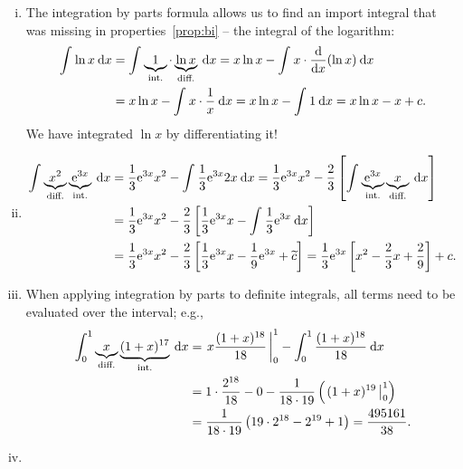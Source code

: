 \begin{example}
\begin{enumerate}[(i)]
	\item 
	The integration by parts formula allows us to find an import integral that was missing in properties~\ref{prop:bi} -- the integral of the logarithm:
	\begin{equation*}
	\begin{split}
	\int_{}^{} \ln x \: \mathrm{d} x 
	& =	\int_{}^{} \underbrace{1}_{\text{int.}} \cdot \underbrace{\ln x}_{\text{diff.}} \: \mathrm{d} x
	= x\ln x - \int_{}^{} x \cdot \displaystyle{\frac{\mathrm{d}}{\mathrm{d}x}}(\ln x) \: \mathrm{d} x \\
	& = x\ln x - \int_{}^{} x\cdot\frac{1}{x} \: \mathrm{d} x
	= x\ln x - \int_{}^{} 1 \: \mathrm{d} x = x\ln x - x + c.
	\end{split}
	\end{equation*}
	We have integrated $\ln x$ by differentiating it!
	\item \begin{equation*}
	\begin{split}
	\int_{}^{} \underbrace{x^2}_{\text{diff.}} \underbrace{\mathrm{e}^{3x}}_{\text{int.}} \: \mathrm{d} x 
	& = \frac13\mathrm{e}^{3x}x^2 - \int_{}^{} \frac13\mathrm{e}^{3x}2x  \: \mathrm{d} x
	= \frac13\mathrm{e}^{3x}x^2 - \frac23 \left[ 
	\int_{}^{} \underbrace{\mathrm{e}^{3x}}_{\text{int.}}\underbrace{x}_{\text{diff.}}  \: \mathrm{d} x \right] \\
	& = \frac13\mathrm{e}^{3x}x^2 - \frac23 
	\left[ \frac13 \mathrm{e}^{3x}x - \int_{}^{} \frac13\mathrm{e}^{3x} \: \mathrm{d} x  \right] \\
	& = \frac13\mathrm{e}^{3x}x^2 - \frac23 
		\left[ \frac13 \mathrm{e}^{3x}x - \frac19\mathrm{e}^{3x} + \widetilde{c} \right] 
	= \frac13 \mathrm{e}^{3x} \left[ x^2-\frac23x+\frac29 \right] + c.
	\end{split}
	\end{equation*}
	\item When applying integration by parts to definite integrals, all terms need to be evaluated over the interval; e.g.,
	\begin{equation*}
	\begin{split}
	\int_{0}^{1} \underbrace{x}_{\text{diff.}}\underbrace{(1+x)^{17}}_{\text{int.}} \: \mathrm{d} x 
	& = \left. x\frac{(1+x)^{18}}{18} \, \right|_{0}^{1} - \int_{0}^{1} \frac{(1+x)^{18}}{18} \: \mathrm{d} x \\
	& = 1 \cdot \frac{2^{18}}{18}-0-\frac{1}{18 \cdot 19} 
		\left( \left. (1+x)^{19} \, \right|_{0}^{1} \right) \\
	& = \frac{1}{18 \cdot 19} \left( 19 \cdot 2^{18} - 2^{19} + 1 \right)
	= \frac{495161}{38}.
	\end{split}
	\end{equation*}
	\item \begin{equation*}

\end{equation*}
\end{enumerate}
\end{example}
